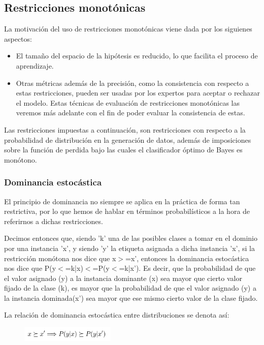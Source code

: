 \subsection{Restricciones monotónicas}

La motivación del uso de restricciones monotónicas viene dada por los siguienes aspectos:
\begin{itemize}
	\item El tamaño del espacio de la hipótesis es reducido, lo que facilita el
	proceso de aprendizaje. 
	\item Otras métricas además de la precisión, como la consistencia con respecto
	a estas restricciones, pueden ser usadas por los expertos para aceptar
	o rechazar el modelo. Estas técnicas de evaluación de restricciones
	monotónicas las veremos más adelante con el fin de poder evaluar 
	la consistencia de estas.
\end{itemize}

Las restricciones impuestas a continuación, son restricciones con respecto a la probabilidad de distribución en la generación de 
datos, además de imposiciones sobre la función de perdida bajo las cuales
el clasificador óptimo de Bayes es monótono.

\subsubsection{Dominancia estocástica}

El principio de dominancia no siempre
se aplica en la práctica de forma tan restrictiva, por lo que hemos de 
hablar en términos probabilísticos a la hora de referirnos a dichas
restricciones.

Decimos entonces que, siendo 'k' una de las posibles clases a tomar en el 
dominio por una instancia 'x', y siendo 'y' la etiqueta asignada a dicha
instancia 'x', si la restricción monótona nos dice que x$>$=x', entonces
la dominancia estocástica nos dice que P(y$<$=k|x)$<$=P(y$<$=k|x').
Es decir, que la probabilidad de que el valor asignado (y) a la instancia 
dominante (x) sea mayor que cierto valor fijado de la clase (k), es mayor
que la probabilidad de que el valor asignado (y) a la instancia dominada(x')
sea mayor que ese mismo cierto valor de la clase fijado.

La relación de dominancia estocástica entre distribuciones se denota así:

\begin{figure}[H]
	\centering
	\includegraphics[width=0.4\textwidth]{imagenes/f1}
\end{figure}

